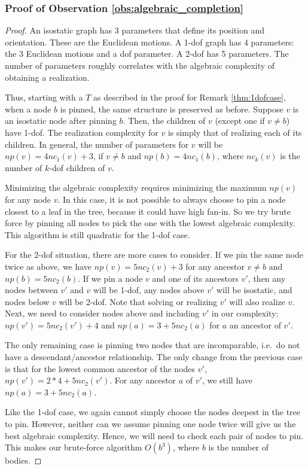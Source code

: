 \subsubsection{Proof of Observation \ref{obs:algebraic_completion}}
\begin{proof}
    An isostatic graph has 3 parameters that define its position and orientation. These are the Euclidean motions. A 1-dof graph has  4 parameters: the 3 Euclidean motions and a dof parameter. A 2-dof has 5 parameters. The number of parameters roughly correlates with the algebraic complexity of obtaining a realization.

    Thus, starting with a $T$ as described in the proof for Remark \ref{thm:1dofcase}, when a node $b$ is pinned, the same structure is preserved as before. Suppose  $v$ is an isostatic node after pinning $b$. Then, the children of $v$ (except one if $v \neq b$) have 1-dof. The realization complexity for $v$ is simply that of realizing each of its children. In general, the number of parameters for $v$  will be $np(v) = 4nc_1(v)+3$, if $v \neq b$ and $np(b) = 4nc_1(b)$, where $nc_k(v)$ is the number of $k$-dof children of $v$.

    Minimizing the algebraic complexity  requires minimizing the maximum $np(v)$ for any node $v$. In this case, it is not possible to always choose to pin a node closest to a leaf in the tree, because it could have high fan-in. So we  try
brute force by pinning all nodes to  pick the one with the lowest algebraic complexity. This algorithm is still quadratic for the 1-dof case.

    For the 2-dof situation, there are more cases to consider. If we pin the same node twice as above, we have $np(v) = 5nc_2(v)+3$ for any ancestor $v \neq b$ and $np(b) = 5nc_2(b)$. If we pin a node $v$ and one of its ancestors $v'$, then any nodes between $v'$ and $v$ will be 1-dof, any nodes above $v'$ will be isostatic, and nodes below $v$ will be 2-dof. Note that solving or realizing $v'$ will also realize $v$.  Next, we need to consider nodes above and including $v'$ in our complexity: $np(v') = 5nc_2(v') + 4$ and $np(a) = 3 + 5nc_2(a)$ for $a$ an ancestor of $v'$.

The only remaining case is pinning two nodes that are incomparable, i.e.\ do not have a descendant/ancestor relationship. The only change from the previous case is that for the lowest common ancestor of the nodes $v'$, $np(v') = 2*4+5nc_2(v')$. For any ancestor $a$ of $v'$, we still have $np(a) = 3 + 5nc_2(a)$.

    Like the 1-dof case, we again cannot simply choose the nodes deepest in the tree to pin. However, neither can we assume pinning one node twice will give us the best algebraic complexity. Hence, we will need to check each pair of nodes to pin. This makes our brute-force algorithm $O(b^3)$, where $b$ is the number of bodies.
\end{proof}




